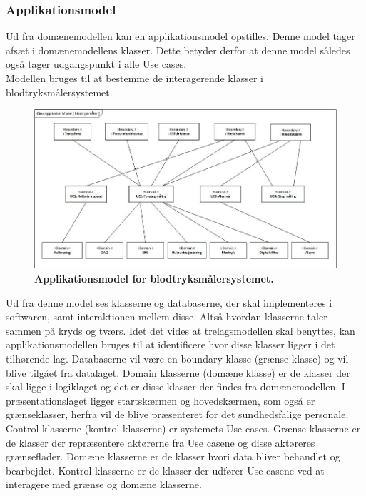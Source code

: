 \subsubsection{Applikationsmodel}
Ud fra domænemodellen kan en applikationsmodel opstilles. Denne model tager afsæt i domænemodellens klasser. Dette betyder derfor at denne model således også tager udgangspunkt i alle Use cases.\\
Modellen bruges til at bestemme de interagerende klasser i blodtryksmålersystemet.\\
\begin{figure}[H]
\includegraphics[width =1.0\textwidth , center]{billeder/appModel}
\caption{\textbf{Applikationsmodel for blodtryksmålersystemet.}}
\end{figure}
Ud fra denne model ses klasserne og databaserne, der skal implementeres i softwaren, samt interaktionen mellem disse. Altså hvordan klasserne taler sammen på kryds og tværs. Idet det vides at trelagsmodellen skal benyttes, kan applikationsmodellen bruges til at identificere hvor disse klasser ligger i det tilhørende lag. Databaserne vil være en boundary klasse (grænse klasse) og vil blive tilgået fra datalaget. Domain klasserne (domæne klasse) er de klasser der skal ligge i logiklaget og det er disse klasser der findes fra domænemodellen. I præsentationslaget ligger startskærmen og hovedskærmen, som også er grænseklasser, herfra vil de blive præsenteret for det sundhedsfalige personale. Control klasserne (kontrol klasserne) er systemets Use cases. Grænse klasserne er de klasser der repræsentere aktørerne fra Use casene og disse aktøreres grænseflader. Domæne klasserne er de klasser hvori data bliver behandlet og bearbejdet. Kontrol klasserne er de klasser der udfører Use casene ved at interagere med grænse og domæne klasserne. \\\\

